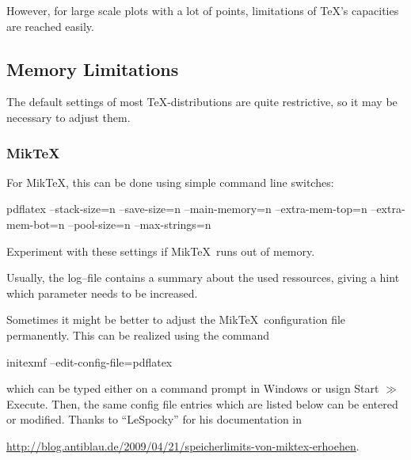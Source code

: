 However, for large scale plots with a lot of points, limitations of \TeX's capacities are reached easily.

\subsection{Memory Limitations}
The default settings of most \TeX-distributions are quite restrictive, so it may be necessary to adjust them. 

\subsubsection{Mik\TeX}
For Mik\TeX, this can be done using simple command line switches:
\begin{codeexample}
pdflatex 
	--stack-size=n --save-size=n 
	--main-memory=n --extra-mem-top=n --extra-mem-bot=n
	--pool-size=n --max-strings=n 
\end{codeexample}
\noindent Experiment with these settings if Mik\TeX\ runs out of memory. 

Usually, the log--file contains a summary about the used ressources, giving a hint which parameter needs to be increased.

Sometimes it might be better to adjust the Mik\TeX\ configuration file permanently. This can be realized using the command
\begin{codeexample}
initexmf --edit-config-file=pdflatex
\end{codeexample}
\noindent which can be typed either on a command prompt in Windows or usign Start $\gg$ Execute. Then, the same config file entries which are listed below can be entered or modified. Thanks to ``LeSpocky'' for his documentation in

\url{http://blog.antiblau.de/2009/04/21/speicherlimits-von-miktex-erhoehen}.


